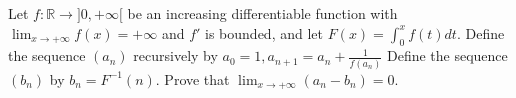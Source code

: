 Let $f: \mathbb{R}\rightarrow ]0,+\infty[$ be an increasing differentiable function with $\lim_{x\rightarrow+\infty}f(x)=+\infty$ and $f'$ is bounded, and let $F(x)=\int^x_0 f(t) dt$.
Define the sequence $(a_n)$ recursively by $a_0=1,a_{n+1}=a_n+\frac1{f(a_n)}$
Define the sequence $(b_n)$ by $b_n=F^{-1}(n)$.
Prove that $\lim_{x\rightarrow+\infty}(a_n-b_n)=0$.